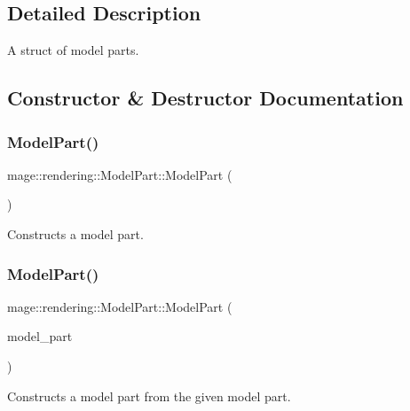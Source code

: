 \subsection{Detailed Description}
A struct of model parts. 

\subsection{Constructor \& Destructor Documentation}
\mbox{\label{structmage_1_1rendering_1_1_model_part_adb7271a00583f72324ab37ab7e668689}} 
\subsubsection{\texorpdfstring{Model\+Part()}{ModelPart()}\hspace{0.1cm}{\footnotesize\ttfamily [1/3]}}
{\footnotesize\ttfamily mage\+::rendering\+::\+Model\+Part\+::\+Model\+Part (\begin{DoxyParamCaption}{ }\end{DoxyParamCaption})}

Constructs a model part. \mbox{\label{structmage_1_1rendering_1_1_model_part_ab9f9bbf4d5a08113483d3744b69e7188}} 
\subsubsection{\texorpdfstring{Model\+Part()}{ModelPart()}\hspace{0.1cm}{\footnotesize\ttfamily [2/3]}}
{\footnotesize\ttfamily mage\+::rendering\+::\+Model\+Part\+::\+Model\+Part (\begin{DoxyParamCaption}\item[{const \mbox{\hyperlink{structmage_1_1rendering_1_1_model_part}{Model\+Part}} \&}]{model\+\_\+part }\end{DoxyParamCaption})\hspace{0.3cm}{\ttfamily [default]}}

Constructs a model part from the given model part.


